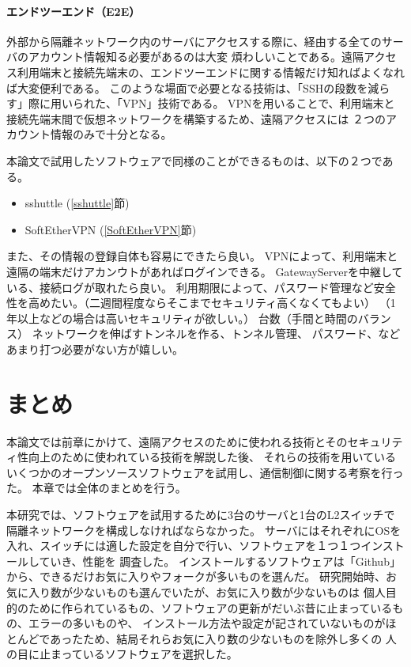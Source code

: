\documentclass[11pt,a4j,titlepage]{jreport}
\begin{document}
\subsubsection*{エンドツーエンド（E2E）}
外部から隔離ネットワーク内のサーバにアクセスする際に、経由する全てのサーバのアカウント情報知る必要があるのは大変
煩わしいことである。遠隔アクセス利用端末と接続先端末の、エンドツーエンドに関する情報だけ知ればよくなれば大変便利である。
このような場面で必要となる技術は、「SSHの段数を減らす」際に用いられた、「VPN」技術である。
VPNを用いることで、利用端末と接続先端末間で仮想ネットワークを構築するため、遠隔アクセスには
２つのアカウント情報のみで十分となる。

\par 本論文で試用したソフトウェアで同様のことができるものは、以下の２つである。
\begin{itemize}
    \item sshuttle (\ref{sshuttle}節)
    \item SoftEtherVPN (\ref{SoftEtherVPN}節)
\end{itemize}\par

また、その情報の登録自体も容易にできたら良い。
VPNによって、利用端末と遠隔の端末だけアカンウトがあればログインできる。
GatewayServerを中継している、接続ログが取れたら良い。
利用期限によって、パスワード管理など安全性を高めたい。（二週間程度ならそこまでセキュリティ高くなくてもよい）
（1年以上などの場合は高いセキュリティが欲しい。）
台数（手間と時間のバランス）
ネットワークを伸ばすトンネルを作る、トンネル管理、
パスワード、などあまり打つ必要がない方が嬉しい。
\fi


\chapter{まとめ}
本論文では前章にかけて、遠隔アクセスのために使われる技術とそのセキュリティ性向上のために使われている技術を解説した後、
それらの技術を用いているいくつかのオープンソースソフトウェアを試用し、通信制御に関する考察を行った。
本章では全体のまとめを行う。\par
本研究では、ソフトウェアを試用するために3台のサーバと1台のL2スイッチで隔離ネットワークを構成しなければならなかった。
サーバにはそれぞれにOSを入れ、スイッチには適した設定を自分で行い、ソフトウェアを１つ１つインストールしていき、性能を
調査した。
インストールするソフトウェアは「Github」から、できるだけお気に入りやフォークが多いものを選んだ。
研究開始時、お気に入り数が少ないものも選んでいたが、お気に入り数が少ないものは
個人目的のために作られているもの、ソフトウェアの更新がだいぶ昔に止まっているもの、エラーの多いものや、
インストール方法や設定が記されていないものがほとんどであったため、結局それらお気に入り数の少ないものを除外し多くの
人の目に止まっているソフトウェアを選択した。
\end{document}
